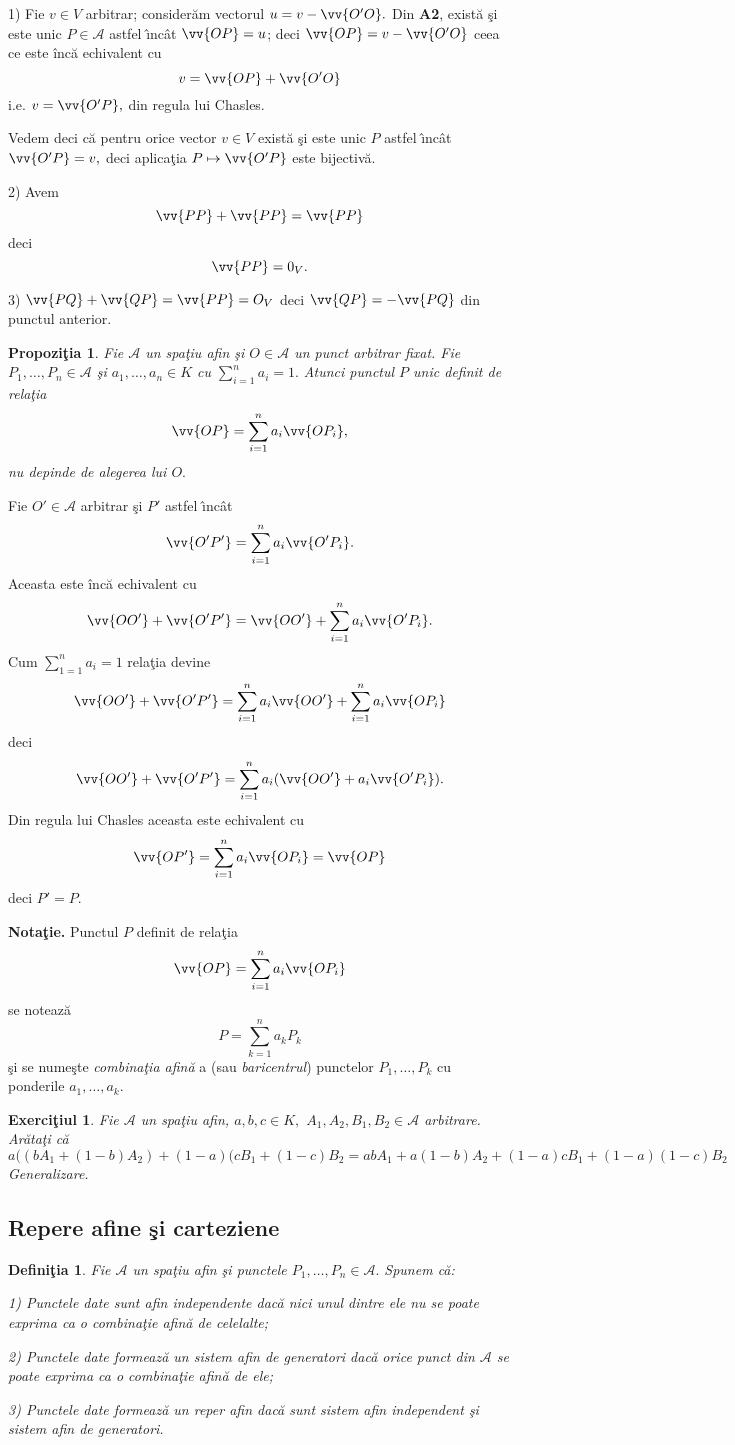 \documentclass[12pt]{book}
\def\Ac{\mathcal A}
\def\ds{\displaystyle\sum}
\def\ai{ast\-fel \^{\i}n\-c\^at }
\def\Dem{\noindent{\bf Demonstra\c tie. }}
\newtheorem{defi}{Defini\c tia }
\newtheorem{prop}{Propozi\c tia }
\newtheorem{exe}{Exerci\c tiul }
\begin{document}
\Dem 1)  Fie $v\in V$ arbitrar; consider\u am vectorul $u=v-\vv{O'O}.$ Din {\bf A2}, exist\u a \c si este unic $P\in \Ac$ \ai $\vv{OP}=u$; deci
$\vv{OP}=v-\vv{O'O}$ ceea ce este \^inc\u a echivalent cu
$$v=\vv{OP}+\vv{O'O}$$ 
i.e. $v=\vv{O'P},$ din regula lui Chasles.

Vedem deci c\u a pentru orice vector $v\in V$ exist\u a \c si este unic $P$ \ai $\vv{O'P}=v,$ deci aplica\c tia $P\mapsto \vv{O'P}$ este bijectiv\u a.

2) Avem $$\vv{PP}+\vv{PP}=\vv{PP}$$ deci $$\vv{PP}=0_V.$$

3) $\vv{PQ}+\vv{QP}=\vv{PP}=O_V$ deci $\vv{QP}=-\vv{PQ}$ din punctul anterior.


\begin{prop} Fie $\Ac $ un spa\c tiu afin \c si $O\in \Ac$ un punct arbitrar fixat. Fie 
$P_1, \dots, P_n\in \Ac$ 
\c si 
$a_1, \dots, a_n\in K$ cu $\ds_{i=1}^na_i=1.$ 
Atunci  punctul $P$ unic  definit de rela\c tia
$$\vv{OP}=\sum_{i=1}^n a_i\vv{OP_i},$$
nu depinde de alegerea lui $O.$
\end{prop}

\Dem Fie $O'\in \Ac$ arbitrar \c si $P'$ \ai 
$$\vv{O'P'}=\sum_{i=1}^n a_i\vv{O'P_i}.$$
Aceasta este \^inc\u a echivalent cu
$$\vv{OO'}+\vv{O'P'}=\vv{OO'}+\sum_{i=1}^n a_i\vv{O'P_i}.$$
Cum $\ds_{1=1}^na_i=1$ rela\c tia devine
$$\vv{OO'}+\vv{O'P'}=\sum_{i=1}^na_i\vv{OO'}+\sum_{i=1}^n a_i\vv{OP_i}$$ 
deci
$$\vv{OO'}+\vv{O'P'}=\sum_{i=1}^na_i(\vv{OO'}+a_i\vv{O'P_i}).$$
Din regula lui Chasles aceasta este  echivalent cu
$$\vv{OP'}=\sum_{i=1}^n a_i\vv{OP_i}=\vv{OP}$$
deci $P'=P.$ 

{\bf Nota\c tie.} Punctul $P$ definit de rela\c tia
$$\vv{OP}=\sum_{i=1}^n a_i\vv{OP_i}$$
se noteaz\u a 
$$P=\sum_{k=1}^na_kP_k$$
\c si se nume\c ste {\em combina\c tia afin\u a} a (sau {\em baricentrul})  punctelor $P_1,\dots, P_k$ cu ponderile $a_1,\dots, a_k.$

\begin{exe} Fie $\Ac$  un spa\c tiu afin, $a, b, c\in K,$ $A_1, A_2, B_1, B_2\in \Ac$ arbitrare.
Ar\u ata\c ti c\u a
$$a((bA_1+(1-b)A_2)+(1-a)( cB_1+(1-c)B_2=abA_1+a(1-b)A_2+(1-a)cB_1+(1-a)(1-c)B_2$$
Generalizare.
\end{exe} 

\subsection{Repere afine \c si carteziene}
\begin{defi} Fie $\Ac$ un spa\c tiu afin \c si punctele $P_1, \dots, P_n\in \Ac .$ Spunem c\u a:

1) Punctele date sunt {\em afin independente} dac\u a nici unul dintre ele nu se poate exprima ca o combina\c tie afin\u a de celelalte;

2) Punctele date formeaz\u a un {\em sistem afin de generatori} dac\u a orice punct din $\Ac$ se poate exprima ca o combina\c tie afin\u a de ele;

3) Punctele date formeaz\u a un {\em reper afin} dac\u a sunt sistem afin independent \c si sistem afin de generatori.
\end{defi}
\end{document}
